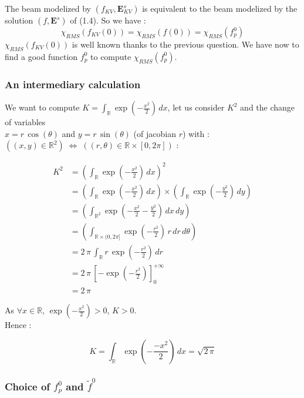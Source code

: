 \documentclass[10pt]{article}
\begin{document}
The beam modelized by $(f_{KV},\mathbf{E}_{KV}^s)$ is equivalent to the beam modelized by the solution $(f,\mathbf{E}^s)$ of (1.4). So we have :
$$\chi_{RMS}(f_{KV}(0)) = \chi_{RMS}(f(0)) = \chi_{RMS}\left(f_p^0\right)$$  
$\chi_{RMS}(f_{KV}(0))$ is well known thanks to the previous question. We have now to find a good function $f_p^0$ to compute $\chi_{RMS}\left(f_p^0\right)$.


\subsubsection{An intermediary calculation}


We want to compute $K = \int_{\mathbb{R}} \exp\left(-\frac{x^2}{2}\right)\,dx$, let us consider $K^2$ and the change of variables \\
$x = r\,\cos(\theta)$ and $y = r\,\sin(\theta)$ (of jacobian $r$) with :
$\left((x,y)\in\mathbb{R}^2\right)\;\Leftrightarrow \; \left((r,\theta)\in\mathbb{R}\times [0,2\pi]\right)$ :

\begin{align*}
K^2 &= \left(\int_{\mathbb{R}} \exp\left(-\frac{x^2}{2}\right)\,dx\right)^2 \\
&= \left(\int_{\mathbb{R}} \exp\left(-\frac{x^2}{2}\right)\,dx\right)\times \left(\int_{\mathbb{R}} \exp\left(-\frac{y^2}{2}\right)\,dy\right) \\
&= \left(\int_{\mathbb{R}^2} \exp\left(-\frac{x^2}{2}-\frac{y^2}{2}\right)\,dx\,dy\right) \\
&= \left(\int_{\mathbb{R}\times (0,2\pi]} \exp\left(-\frac{r^2}{2}\right)\,r\,dr\,d\theta\right) \\
&= 2\,\pi\,\int_{\mathbb{R}} r\,\exp\left(-\frac{r^2}{2}\right)\,dr \\
&= 2\,\pi\, \left[-\exp\left(-\frac{r^2}{2}\right)\right]_0^{+\infty} \\
&= 2\,\pi
\end{align*}

As $\forall x\in\mathbb{R}$, $\exp\left(-\frac{x^2}{2}\right) > 0$, $K >0$. \\

Hence :

$$\boxed{K = \int_{\mathbb{R}}\exp\left(-\frac{-x^2}{2}\right)\,dx = \sqrt{2\,\pi}}$$


\subsubsection{Choice of $f_p^0$ and $\tilde{f}^0$}
\end{document}
